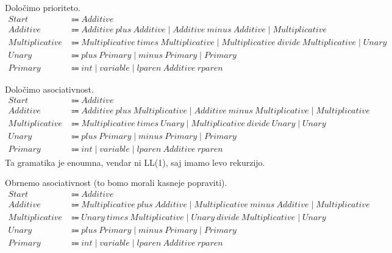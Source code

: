 \documentclass{report}
\newcommand{\Spc}{\ }
\newcommand{\Union}{\mathrel{|}}
\newcommand{\Arrow}{\Coloneq}
\newcommand{\NT}[1]{{#1}}
\newcommand{\T}[1]{{#1}}
\begin{document}
Določimo prioriteto.
\begin{align*}
  \NT{Start} &\Arrow \NT{Additive}\\
  \NT{Additive} &\Arrow \NT{Additive} \Spc \T{plus} \Spc \NT{Additive} \Union \NT{Additive} \Spc \T{minus} \Spc \NT{Additive} \Union \NT{Multiplicative}\\
  \NT{Multiplicative} &\Arrow \NT{Multiplicative} \Spc \T{times} \Spc \NT{Multiplicative} \Union \NT{Multiplicative} \Spc \T{divide} \Spc \NT{Multiplicative} \Union \NT{Unary}\\
  \NT{Unary} &\Arrow \T{plus} \Spc \NT{Primary} \Union \T{minus} \Spc \NT{Primary} \Union \NT{Primary}\\ 
  \NT{Primary} &\Arrow \T{int} \Union \T{variable} \Union \T{lparen} \Spc \NT{Additive} \Spc \T{rparen}
\end{align*}

Določimo asociativnost.
\begin{align*}
  \NT{Start} &\Arrow \NT{Additive}\\
  \NT{Additive} &\Arrow \NT{Additive} \Spc \T{plus} \Spc \NT{Multiplicative} \Union \NT{Additive} \Spc \T{minus} \Spc \NT{Multiplicative} \Union \NT{Multiplicative}\\
  \NT{Multiplicative} &\Arrow \NT{Multiplicative} \Spc \T{times} \Spc \NT{Unary} \Union \NT{Multiplicative} \Spc \T{divide} \Spc \NT{Unary} \Union \NT{Unary}\\
  \NT{Unary} &\Arrow \T{plus} \Spc \NT{Primary} \Union \T{minus} \Spc \NT{Primary} \Union \NT{Primary}\\ 
  \NT{Primary} &\Arrow \T{int} \Union \T{variable} \Union \T{lparen} \Spc \NT{Additive} \Spc \T{rparen}
\end{align*}
Ta gramatika je enoumna, vendar ni LL(1), saj imamo levo rekurzijo.

Obrnemo asociativnost (to bomo morali kasneje popraviti).
\begin{align*}
  \NT{Start} &\Arrow \NT{Additive}\\
  \NT{Additive} &\Arrow \NT{Multiplicative} \Spc \T{plus} \Spc \NT{Additive} \Union \NT{Multiplicative} \Spc \T{minus} \Spc \NT{Additive} \Union \NT{Multiplicative}\\
  \NT{Multiplicative} &\Arrow \NT{Unary} \Spc \T{times} \Spc \NT{Multiplicative} \Union \NT{Unary} \Spc \T{divide} \Spc \NT{Multiplicative} \Union \NT{Unary}\\
  \NT{Unary} &\Arrow \T{plus} \Spc \NT{Primary} \Union \T{minus} \Spc \NT{Primary} \Union \NT{Primary}\\ 
  \NT{Primary} &\Arrow \T{int} \Union \T{variable} \Union \T{lparen} \Spc \NT{Additive} \Spc \T{rparen}
\end{align*}
\end{document}
